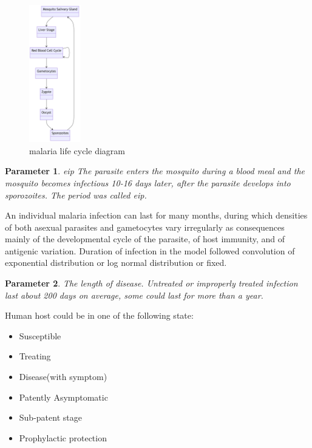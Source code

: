 \documentclass[a4paper, 12pt, twoside]{article}
\newtheorem{parameter}{Parameter}
\begin{document}
\begin{figure}[htpb]
	\centering
	\includegraphics[width=0.2\textwidth]{malaria-life-cycle-diagram}
	\caption{malaria life cycle diagram}
	\label{fig:malaria-life-cycle-diagram}
\end{figure}

\begin{parameter}{\gls{eip}}
	The parasite enters the mosquito during a blood meal and the mosquito becomes infectious 10-16 days later, after the parasite develops into sporozoites.
	The period was called \gls{eip}.
\end{parameter}

An individual malaria infection can last for many months, during which densities of both asexual parasites and gametocytes vary irregularly as consequences mainly of the developmental cycle of the parasite, of host immunity, and of antigenic variation.
Duration of infection in the model followed convolution of exponential distribution or log normal distribution or fixed.

\begin{parameter}
	{The length of disease.}
	{Untreated or improperly treated infection last about 200 days on average, some could last for more than a year.}
\end{parameter}

Human host could be in one of the following state:
\begin{itemize}
	\item Susceptible
	\item Treating
	\item Disease(with symptom)
	\item Patently Asymptomatic
	\item Sub-patent stage
	\item Prophylactic protection
\end{itemize}
\end{document}
